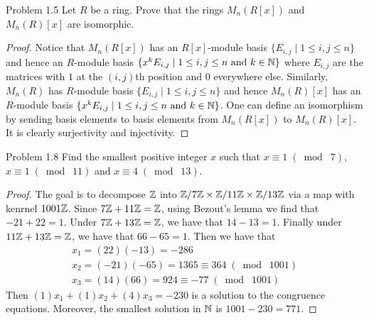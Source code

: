 \documentclass[a4paper]{article}
\begin{document}
\begin{ex}{Problem 1.5}{} Let $R$ be a ring. Prove that the rings $M_n(R[x])$ and $M_n(R)[x]$ are isomorphic. \tcbline
\begin{proof}
Notice that $M_n(R[x])$ has an $R[x]$-module basis $\{E_{i,j}\;|\;1\leq i,j\leq n\}$ and hence an $R$-module basis $\{x^kE_{i,j}\;|\;1\leq i,j\leq n\text{ and }k\in\mathbb{N}\}$ where $E_{i,j}$ are the matrices with $1$ at the $(i,j)$th position and $0$ everywhere else. Similarly, $M_n(R)$ has $R$-module basis $\{E_{i,j}\;|\;1\leq i,j\leq n\}$ and hence $M_n(R)[x]$ has an $R$-module basis $\{x^kE_{i,j}\;|\;1\leq i,j\leq n\text{ and }k\in\mathbb{N}\}$. One can define an isomorphism by sending basis elements to basis elements from $M_n(R[x])$ to $M_n(R)[x]$. It is clearly surjectivity and injectivity. 
\end{proof}
\end{ex}

\begin{ex}{Problem 1.8}{} Find the smallest positive integer $x$ such that $x\equiv 1\;(\bmod\;7)$, $x\equiv 1\;(\bmod\;11)$ and $x\equiv 4\;(\bmod\;13)$. \tcbline
\begin{proof}
The goal is to decompose $\mathbb{Z}$ into $\mathbb{Z}/7\mathbb{Z}\times\mathbb{Z}/11\mathbb{Z}\times\mathbb{Z}/13\mathbb{Z}$ via a map with kenrnel $1001\mathbb{Z}$. Since $7\mathbb{Z}+11\mathbb{Z}=\mathbb{Z}$, using Bezout's lemma we find that $-21+22=1$. Under $7\mathbb{Z}+13\mathbb{Z}=\mathbb{Z}$, we have that $14-13=1$. Finally under $11\mathbb{Z}+13\mathbb{Z}=\mathbb{Z}$, we have that $66-65=1$. Then we have that 
\begin{gather*}
x_1=(22)(-13)=-286\\
x_2=(-21)(-65)=1365\equiv 364\;(\bmod\;1001)\\
x_3=(14)(66)=924\equiv -77\;(\bmod\;1001)
\end{gather*}
Then $(1)x_1+(1)x_2+(4)x_3=-230$ is a solution to the congruence equations. Moreover, the smallest solution in $\mathbb{N}$ is $1001-230=771$. 
\end{proof}
\end{ex}
\end{document}
